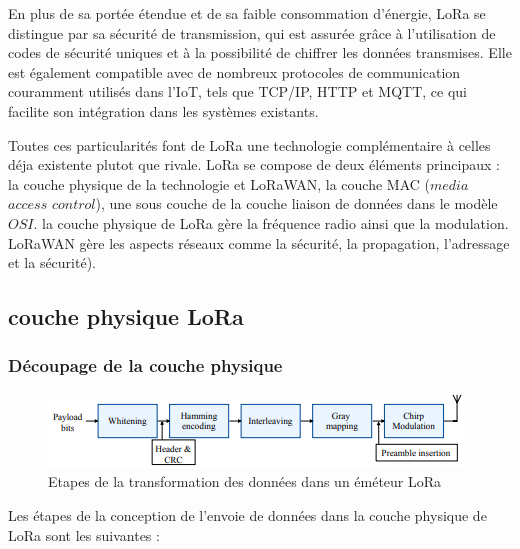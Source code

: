 \vspace{0.1cm}

En plus de sa portée étendue et de sa faible consommation d'énergie, LoRa se distingue par sa sécurité de transmission, qui est assurée grâce à l'utilisation de codes de sécurité uniques et à la possibilité de chiffrer les données transmises. Elle est également compatible avec de nombreux protocoles de communication couramment utilisés dans l'IoT, tels que TCP/IP, HTTP et MQTT, ce qui facilite son intégration dans les systèmes existants.

\vspace{0.1cm}

Toutes ces  particularités font de LoRa une technologie complémentaire à celles déja existente plutot que rivale.
LoRa se compose de deux éléments principaux : la couche physique de la technologie et LoRaWAN, la couche MAC ($media$ $access$ $control$), une sous couche de la couche liaison de données dans le modèle $OSI$. la couche physique de LoRa gère la fréquence radio ainsi que la modulation. LoRaWAN gère les aspects réseaux comme la sécurité, la propagation, l'adressage et la sécurité).

\subsection{couche physique LoRa}

\subsubsection{Découpage de la couche physique}

\begin{figure}[h]
\centering

\includegraphics[scale=1]{images/physical_lora_rx.PNG}
\caption{Etapes de la transformation des données dans un éméteur LoRa}\label{term3}
\end{figure}


Les étapes de la conception de l'envoie de données dans la couche physique de LoRa sont les suivantes :

\vspace{0.1cm}

